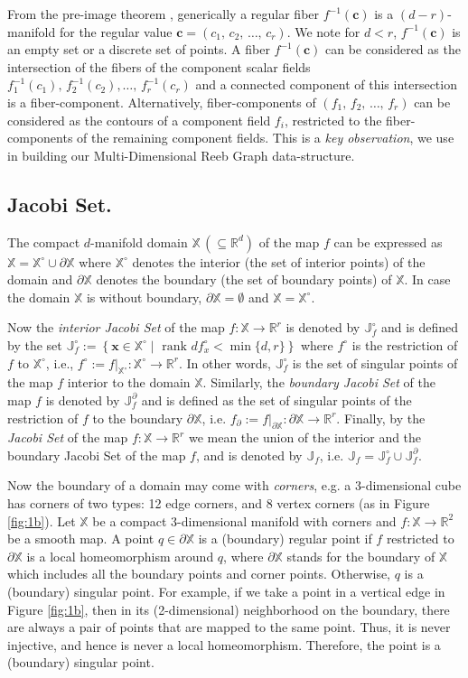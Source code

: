 \documentclass[twocolumn]{article}
\newcommand{\bx}{\mathbf{x}}
\newcommand{\bc}{\mathbf{c}}
\newcommand{\X}{\mathbb{X}}
\newcommand{\R}{\mathbb{R}}
\newcommand{\Int}[1]{{#1}^{\circ}}
\newcommand{\Bd}[1]{{#1}^{\partial}}
\newcommand{\Ji}{\Int{\mathbb{J}}_f}
\newcommand{\Jb}{\Bd{\mathbb{J}}_f}
\newcommand{\Jf}{\mathbb{J}_f}
\newcommand{\figref}[1]{Figure \ref{fig:#1}}
\begin{document}
From the pre-image theorem \cite{1974-gp-dt}, generically a regular fiber
$f^{-1}(\bc)$ is a $(d-r)$-manifold for the regular value $\bc=(c_1,\, c_2,\, \ldots,\, c_r)$. 
We note for $d<r$, $f^{-1}(\bc)$ is an empty set or a discrete set of points.
A fiber $f^{-1}(\bc)$ can be considered as the intersection of
the fibers of the component scalar fields
$f_1^{-1}(c_1),\, f_2^{-1}(c_2),\ldots ,\, f_r^{-1}(c_r)$ and
a connected component of this intersection is a
fiber-component. Alternatively, fiber-components of
$(f_1,\,f_2,\,\ldots,\,f_r)$ can be considered as the contours of a
component field $f_i$, restricted to the fiber-components of the
remaining component fields. This is a \textit{key observation}, we use
in building our Multi-Dimensional Reeb Graph data-structure.

\subsection*{Jacobi Set.}  The compact $d$-manifold domain $\X \, (\subseteq\mathbb{R}^d)$ of the map $f$ can be expressed as
$\mathbb{X}=\Int{\X}\cup \partial\X$ where
$\Int{\X}$ denotes the interior (the set of interior points) of
the domain  and $\partial\X$ denotes the boundary (the set of boundary
points) of $\X$.  In case the domain $\X$ is without boundary, $\partial
\X=\emptyset$ and $\X=\Int{\X}$. 

Now the \emph{interior Jacobi Set} of  the map
$f:\mathbb{X}\rightarrow\mathbb{R}^r$
is denoted by $\Ji$ and is defined by the set 
$\Ji := \left\{ \bx \in \Int{\X} \mid \text{ rank }
  d\Int{f}_x<\min\{d, r\} \right\}$ \cite{2004-edels-jacobi} where
$\Int{f}$ is the restriction of $f$ to $\Int{\X}$, i.e., $\Int{f}:= f|_{\Int{\X}}:{\Int{\X}}\rightarrow \mathbb{R}^r$.
In other words, $\Ji$ is the set of singular points of the map
$f$ interior to the domain $\X$. Similarly, the \emph{boundary Jacobi
  Set} of the map $f$ is denoted by $\Jb$ and is defined as the set of singular points of the
restriction of $f$ to the boundary $\partial\X$, i.e.  $f_\partial:=f|_{\partial  \X}: \partial \X\rightarrow \mathbb{R}^r$. 
Finally, by the \emph{Jacobi Set} of the map $f: \X\rightarrow\R^r$ we mean
the union of the interior and the boundary Jacobi Set of the map $f$,
and is denoted by $\Jf$, i.e. $\Jf=\Ji\cup \Jb$. 

Now the boundary of a domain may come with \emph{corners}, e.g. a
3-dimensional cube has corners
of two types: 12 edge corners, and 8 vertex corners (as in \figref{1b}). Let $\X$ be a compact $3$-dimensional manifold
with corners and $f : \X \to \R^2$ be a smooth
map. A point $q \in \partial \X$ is a (boundary)
regular point if $f$ restricted to $\partial \X$
is a local homeomorphism around $q$, where
$\partial \X$ stands for the boundary of $\X$ which
includes all the boundary points and corner points.
Otherwise, $q$ is a (boundary) singular point.
For example, if we take a point in a vertical edge in \figref{1b},
then in its (2-dimensional) neighborhood on
the boundary, there are always a pair of points
that are mapped to the same point.
Thus, it is never injective, and hence is never a
local homeomorphism. Therefore, the point
is a (boundary) singular point.
\end{document}
